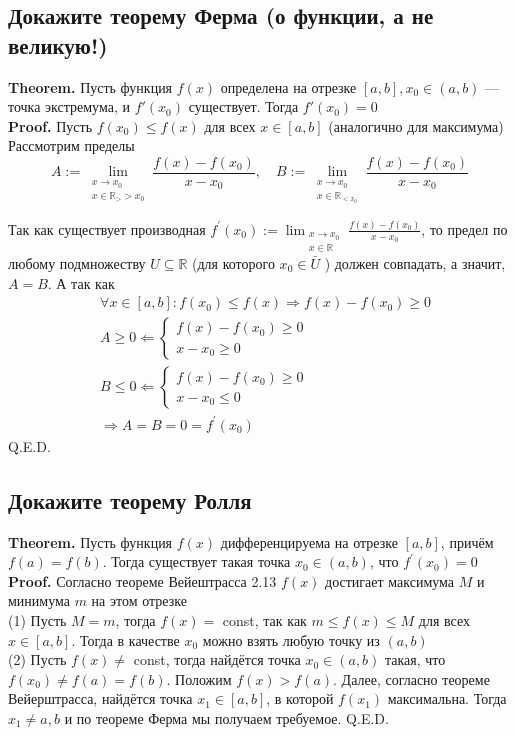 \documentclass[a4paper]{article}
\begin{document}
\subsection{Докажите теорему Ферма (о функции, а не великую!)}
\textbf{Theorem.} Пусть функция $f(x)$ определена на отрезке $[a,b],x_0\in(a,b)$ — точка экстремума, и $f'(x_0)$ существует. Тогда $f'(x_0) = 0$\\[2mm]
\textbf{Proof.} Пусть $f\left(x_0\right) \leqslant f(x)$ для всех $x \in[a, b]$ (аналогично для максимума)
Рассмотрим пределы
$$
A:=\lim _{\substack{x \rightarrow x_0 \\ x \in \mathbb{R}_{>}>x_0}} \frac{f(x)-f\left(x_0\right)}{x-x_0}, \quad B:=\lim _{\substack{x \rightarrow x_0 \\ x \in \mathbb{R}_{<x_0}}} \frac{f(x)-f\left(x_0\right)}{x-x_0}
$$

Так как существует производная $f^{\prime}\left(x_0\right):=\lim _{\substack{x \rightarrow x_0 \\ x \in \mathbb{R}}} \frac{f(x)-f\left(x_0\right)}{x-x_0}$, то предел по любому подмножеству $U \subseteq \mathbb{R}$ (для которого $x_0 \in \bar{U}$ ) должен совпадать, а значит, $A=B$. А так как
$$
\begin{aligned}
& \forall x \in[a, b]: f\left(x_0\right) \leqslant f(x) \Longrightarrow f(x)-f\left(x_0\right) \geqslant 0 \\
& A \geqslant 0 \Longleftarrow\left\{\begin{array}{l}
f(x)-f\left(x_0\right) \geqslant 0 \\
x-x_0 \geqslant 0
\end{array}\right. \\
& B \leqslant 0 \Longleftarrow\left\{\begin{array}{l}
f(x)-f\left(x_0\right) \geqslant 0 \\
x-x_0 \leqslant 0
\end{array}\right. \\
& \Longrightarrow A=B=0=f^{\prime}\left(x_0\right)
\end{aligned}
$$
Q.E.D.


\subsection{Докажите теорему Ролля}
\textbf{Theorem.} Пусть функция $f(x)$ дифференцируема на отрезке $[a, b]$, причём $f(a)=f(b)$. Тогда существует такая точка $x_0 \in(a, b)$, что $f^{\prime}\left(x_0\right)=0$\\[2mm]
\textbf{Proof.} Согласно теореме Вейештрасса 2.13 $f(x)$ достигает максимума $M$ и минимума $m$ на этом отрезке\\[2mm]
(1) Пусть $M=m$, тогда $f(x)=$ const, так как $m \leq f(x) \leq M$ для всех $x \in[a, b]$. Тогда в качестве $x_0$ можно взять любую точку из $(a, b)$\\[2mm]
(2) Пусть $f(x) \neq$ const, тогда найдётся точка $x_0 \in(a, b)$ такая, что $f\left(x_0\right) \neq f(a)=f(b)$. Положим $f(x)>f(a)$. Далее, согласно теореме Вейерштрасса, найдётся точка $x_1 \in[a, b]$, в которой $f\left(x_1\right)$ максимальна. Тогда $x_1 \neq a, b$ и по теореме Ферма мы получаем требуемое. Q.E.D.
\end{document}
